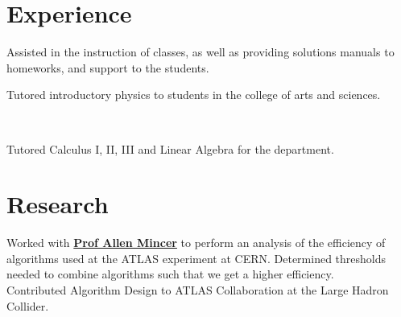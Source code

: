 \documentclass[]{deedy-resume-openfont}
\begin{document}
\begin{minipage}[t]{0.66\textwidth} 


\section{Experience}

\vspace{\topsep} %
\begin{tightemize}\item Assisted in the instruction of classes, as well as
        providing solutions manuals to homeworks, and support to the students.
\end{tightemize}
\sectionsep

\vspace{\topsep} %
\begin{tightemize}\item Tutored introductory physics to students in the college of arts
and sciences. 
\end{tightemize}
\sectionsep

\\
\begin{tightemize}
\item Tutored Calculus I, II, III and Linear Algebra for the department. 
\end{tightemize}
\sectionsep


\section{Research}
Worked with \textbf{\href{https://as.nyu.edu/content/nyu-as/as/faculty/allen-mincer.html}{Prof Allen Mincer}} 
to perform an analysis of the efficiency of algorithms used at the ATLAS
experiment at CERN. 
Determined thresholds needed to combine algorithms such that we get a higher
efficiency. \\
Contributed Algorithm Design to ATLAS Collaboration at the Large Hadron
Collider.
\sectionsep


\end{minipage}
\end{document}
